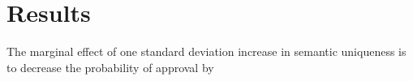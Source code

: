 \section{Results}\label{sec_results}

The marginal effect of one standard deviation increase in semantic uniqueness is to decrease the probability of approval by 
